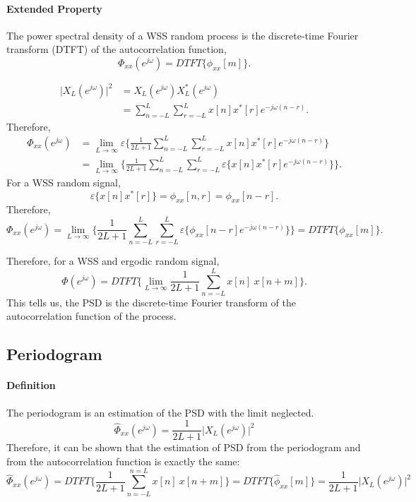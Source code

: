 \paragraph{Extended Property} The power spectral density of a WSS random process is the discrete-time Fourier transform (DTFT) of the autocorrelation function,
\[
    \Phi_{xx}(e^{j\omega}) = DTFT \{\phi_{xx}[m]\}.
\]
\begin{dv}{}
\begin{align*}
    \lvert X_{L}(e^{j\omega})\rvert^2 
    & = X_L(e^{j\omega}) X_L^{*}(e^{j\omega}) \\
    & = \sum_{n=-L}^{L} \sum_{r=-L}^{L} x[n] x^{*}[r] e^{-j\omega (n-r)}.
\end{align*}    
Therefore,
\begin{align*}
    \Phi_{xx}(e^{j\omega}) 
    & = \lim_{L\to\infty} \varepsilon \bigg\{ \frac{1}{2L+1} \sum_{n=-L}^{L} \sum_{r=-L}^{L} x[n] x^{*}[r] e^{-j\omega (n-r)} \bigg\} \\
    & = \lim_{L\to \infty} \bigg\{ \frac{1}{2L+1} \sum_{n=-L}^{L} \sum_{r=-L}^{L} \varepsilon \{ x[n] x^{*}[r] e^{-j\omega (n-r)} \} \bigg \}.
\end{align*}
For a WSS random signal,
\[
    \varepsilon \{ x[n] x^{*}[r] \} = \phi_{xx}[n, r] = \phi_{xx}[n-r].
\]
Therefore,
\[
    \Phi_{xx}(e^{j\omega}) = \lim_{L\to \infty} \bigg\{ \frac{1}{2L+1} \sum_{n=-L}^{L} \sum_{r=-L}^{L} \varepsilon \{ \phi_{xx}[n-r] e^{-j\omega (n-r)} \} \bigg \} = DTFT\{\phi_{xx}[m]\}.
\]
\end{dv}

Therefore, for a WSS and ergodic random signal,
\[
    \Phi(e^{j\omega}) = DTFT \bigg\{ \lim_{L\to\infty} \frac{1}{2L+1} \sum_{n=-L}^{L} x[n] \ x[n+m] \bigg\}.
\]
This tells us, the PSD is the discrete-time Fourier transform of the autocorrelation function of the process.

\subsection{Periodogram}
\paragraph{Definition} The periodogram is an estimation of the PSD with the limit neglected. 
\[
    \widehat{\Phi}_{xx} (e^{j\omega}) = \frac{1}{2L+1} \lvert X_{L} (e^{j\omega}) \rvert^2
\]
Therefore, it can be shown that the estimation of PSD from the periodogram and from the autocorrelation function is exactly the same:
\[
    \widehat{\Phi}_{xx}(e^{j\omega}) = DTFT \bigg\{ \frac{1}{2L+1} \sum_{n=-L}^{n=L} x[n] \ x[n+m] \bigg\} = DTFT \{ \widehat{\phi}_{xx}[m] \} = \frac{1}{2L+1} \lvert X_{L}(e^{j\omega})\rvert^2
\]
